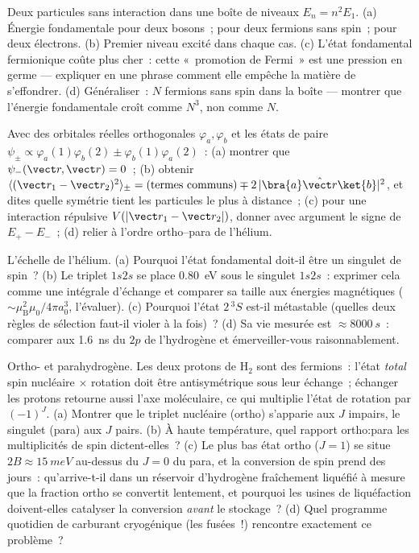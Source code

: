 \begin{exercise}[$\star\star$]\label{exo:b3:identical-particles:5}
Deux particules sans interaction dans une boîte de niveaux
$E_n = n^2E_1$. (a) Énergie fondamentale pour deux bosons~; pour deux
fermions sans spin~; pour deux électrons. (b) Premier niveau excité
dans chaque cas. (c) L'état fondamental fermionique coûte plus cher~:
cette «~promotion de Fermi~» est une pression en germe --- expliquer
en une phrase comment elle empêche la matière de s'effondrer. (d)
Généraliser~: $N$ fermions sans spin dans la boîte --- montrer que
l'énergie fondamentale croît comme $N^3$, non comme $N$.
\end{exercise}

\begin{exercise}[$\star\star$]\label{exo:b3:identical-particles:6}
Avec des orbitales réelles orthogonales $\varphi_a, \varphi_b$ et les
états de paire $\psi_\pm \propto \varphi_a(1)\varphi_b(2) \pm
\varphi_b(1)\varphi_a(2)$~: (a) montrer que $\psi_-(\vect r, \vect r) = 0$~;
(b) obtenir
$\langle(\vect r_1 - \vect r_2)^2\rangle_\pm =
(\text{termes communs}) \mp 2\,|\bra{a}\hat{\vect r}\ket{b}|^2$, et
dites quelle symétrie tient les particules le plus à distance~; (c)
pour une interaction répulsive $V(|\vect r_1 - \vect r_2|)$, donner
avec argument le signe de $E_+ - E_-$~; (d) relier à l'ordre
ortho--para de l'hélium.
\end{exercise}

\begin{exercise}[$\star\star$]\label{exo:b3:identical-particles:7}
L'échelle de l'hélium. (a) Pourquoi l'état fondamental doit-il être un
singulet de spin~? (b) Le triplet $1s2s$ se place \qty{0.80}{eV} sous
le singulet $1s2s$~: exprimer cela comme une intégrale d'échange et
comparer sa taille aux énergies magnétiques ($\sim\mu_{\text{B}}^2\mu_0/4\pi
a_0^3$, l'évaluer). (c) Pourquoi l'état $2\,^3S$ est-il métastable
(quelles deux règles de sélection faut-il violer à la fois)~? (d) Sa
vie mesurée est $\approx\qty{8000}{s}$~: comparer aux \qty{1.6}{ns} du
$2p$ de l'hydrogène et émerveiller-vous raisonnablement.
\end{exercise}

\begin{exercise}[$\star\star$]\label{exo:b3:identical-particles:8}
Ortho- et parahydrogène. Les deux protons de H$_2$ sont des
fermions~: l'état \emph{total} spin nucléaire $\times$ rotation doit
être antisymétrique sous leur échange~; échanger les protons retourne
aussi l'axe moléculaire, ce qui multiplie l'état de rotation par
$(-1)^J$. (a) Montrer que le triplet nucléaire (ortho) s'apparie aux
$J$ impairs, le singulet (para) aux $J$ pairs. (b) À haute
température, quel rapport ortho:para les multiplicités de spin
dictent-elles~? (c) Le plus bas état ortho ($J = 1$) se situe
$2B \approx \qty{15}{meV}$ au-dessus du $J = 0$ du para, et la
conversion de spin prend des jours~: qu'arrive-t-il dans un réservoir
d'hydrogène fraîchement liquéfié à mesure que la fraction ortho se
convertit lentement, et pourquoi les usines de liquéfaction
doivent-elles catalyser la conversion \emph{avant} le stockage~? (d)
Quel programme quotidien de carburant cryogénique (les fusées~!)
rencontre exactement ce problème~?
\end{exercise}

